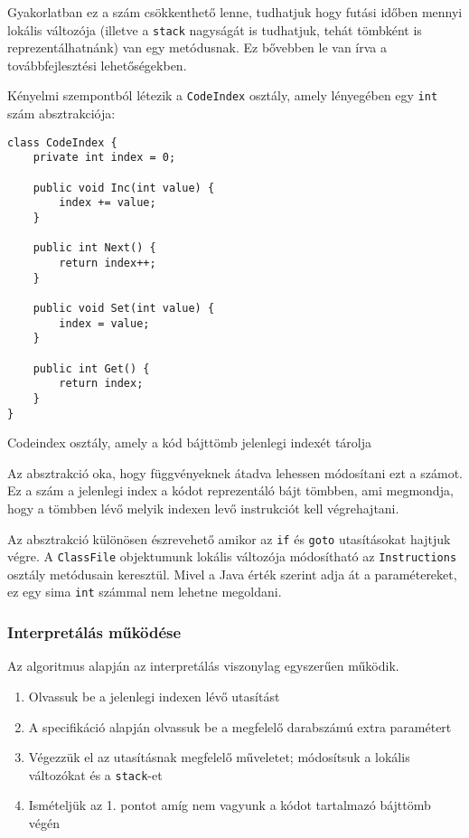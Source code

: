 Gyakorlatban ez a szám csökkenthető lenne, tudhatjuk hogy futási időben mennyi lokális változója (illetve a \lstinline{stack} nagyságát is tudhatjuk, tehát tömbként is reprezentálhatnánk) van egy metódusnak. Ez bővebben le van írva a továbbfejlesztési lehetőségekben.

Kényelmi szempontból létezik a \lstinline{CodeIndex} osztály, amely lényegében egy \lstinline{int} szám absztrakciója:
\begin{listing}[H]
\begin{verbatim}
class CodeIndex {
    private int index = 0;

    public void Inc(int value) {
        index += value;
    }

    public int Next() {
        return index++;
    }

    public void Set(int value) {
        index = value;
    }

    public int Get() {
        return index;
    }
}
\end{verbatim}
\caption{Codeindex osztály, amely a kód bájttömb jelenlegi indexét tárolja}
\end{listing}
Az absztrakció oka, hogy függvényeknek átadva lehessen módosítani ezt a számot. Ez a szám a jelenlegi index a kódot reprezentáló bájt tömbben, ami megmondja, hogy a tömbben lévő melyik indexen levő instrukciót kell végrehajtani.

Az absztrakció különösen észrevehető amikor az \lstinline{if} és \lstinline{goto} utasításokat hajtjuk végre. A \lstinline{ClassFile} objektumunk lokális változója módosítható az \lstinline{Instructions} osztály metódusain keresztül. Mivel a Java érték szerint adja át a paramétereket, ez egy sima \lstinline{int} számmal nem lehetne megoldani.

\subsubsection{Interpretálás működése}

Az algoritmus alapján az interpretálás viszonylag egyszerűen működik.
\begin{enumerate}
	\item Olvassuk be a jelenlegi indexen lévő utasítást
	\item A specifikáció alapján olvassuk be a megfelelő darabszámú extra paramétert
	\item Végezzük el az utasításnak megfelelő műveletet; módosítsuk a lokális változókat és a \lstinline{stack}-et
	\item Ismételjük az 1. pontot amíg nem vagyunk a kódot tartalmazó bájttömb végén
\end{enumerate}

